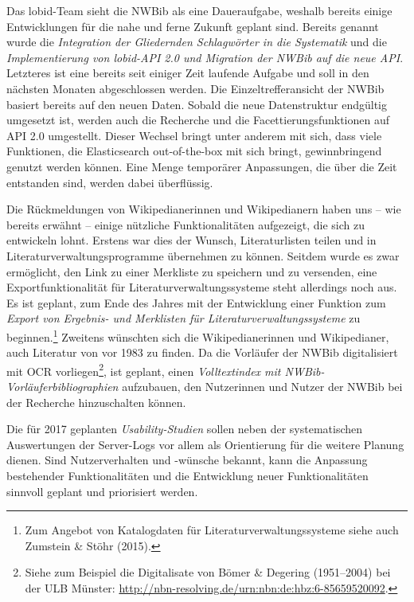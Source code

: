 \documentclass[a4paper,
fontsize=11pt,
oneside,
numbers=noperiodatend,
parskip=half-,
bibliography=totoc,
final
]{scrartcl}
\begin{document}
Das lobid-Team sieht die NWBib als eine Daueraufgabe, weshalb bereits
einige Entwicklungen für die nahe und ferne Zukunft geplant sind.
Bereits genannt wurde die \emph{Integration der Gliedernden Schlagwörter
in die Systematik} und die \emph{Implementierung von lobid-API 2.0 und
Migration der NWBib auf die neue API}. Letzteres ist eine bereits seit
einiger Zeit laufende Aufgabe und soll in den nächsten Monaten
abgeschlossen werden. Die Einzeltrefferansicht der NWBib basiert bereits
auf den neuen Daten. Sobald die neue Datenstruktur endgültig umgesetzt
ist, werden auch die Recherche und die Facettierungsfunktionen auf API
2.0 umgestellt. Dieser Wechsel bringt unter anderem mit sich, dass viele
Funktionen, die Elasticsearch out-of-the-box mit sich bringt,
gewinnbringend genutzt werden können. Eine Menge temporärer Anpassungen,
die über die Zeit entstanden sind, werden dabei überflüssig.

Die Rückmeldungen von Wikipedianerinnen und Wikipedianern haben uns --
wie bereits erwähnt -- einige nützliche Funktionalitäten aufgezeigt, die
sich zu entwickeln lohnt. Erstens war dies der Wunsch, Literaturlisten
teilen und in Literaturverwaltungsprogramme übernehmen zu können.
Seitdem wurde es zwar ermöglicht, den Link zu einer Merkliste zu
speichern und zu versenden, eine Exportfunktionalität für
Literaturverwaltungssysteme steht allerdings noch aus. Es ist geplant,
zum Ende des Jahres mit der Entwicklung einer Funktion zum \emph{Export
von Ergebnis- und Merklisten für Literaturverwaltungssysteme} zu
beginnen.\footnote{Zum Angebot von Katalogdaten für
  Literaturverwaltungssysteme siehe auch Zumstein \& Stöhr (2015).}
Zweitens wünschten sich die Wikipedianerinnen und Wikipedianer, auch
Literatur von vor 1983 zu finden. Da die Vorläufer der NWBib
digitalisiert mit OCR vorliegen\footnote{Siehe zum Beispiel die
  Digitalisate von Bömer \& Degering (1951--2004) bei der ULB Münster:
  \url{http://nbn-resolving.de/urn:nbn:de:hbz:6-85659520092}.}, ist
geplant, einen \emph{Volltextindex mit NWBib-Vorläuferbibliographien}
aufzubauen, den Nutzerinnen und Nutzer der NWBib bei der Recherche
hinzuschalten können.

Die für 2017 geplanten \emph{Usability-Studien} sollen neben der
systematischen Auswertungen der Server-Logs vor allem als Orientierung
für die weitere Planung dienen. Sind Nutzerverhalten und -wünsche
bekannt, kann die Anpassung bestehender Funktionalitäten und die
Entwicklung neuer Funktionalitäten sinnvoll geplant und priorisiert
werden.

\end{document}
